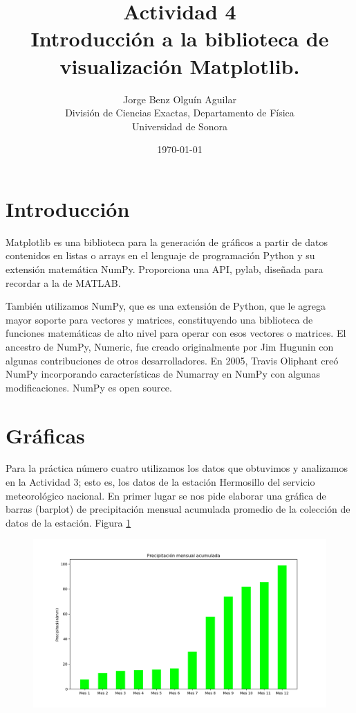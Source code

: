 \documentclass[12pt,a4paper]{article}
\begin{document}
\title{Actividad 4\\ Introducción a la biblioteca de visualización Matplotlib.  }
\author{
 Jorge Benz Olguín Aguilar\\
\small{División de Ciencias Exactas, Departamento de Física}\\
\small{Universidad de Sonora}\\
}
\date{\small{\today}}
\maketitle

\section*{Introducción}

\noindent Matplotlib es una biblioteca para la generación de gráficos a partir de datos contenidos en listas o arrays en el lenguaje de programación Python y su extensión matemática NumPy. Proporciona una API, pylab, diseñada para recordar a la de MATLAB.\cite{1}

\noindent También utilizamos NumPy, que es una extensión de Python, que le agrega mayor soporte para vectores y matrices, constituyendo una biblioteca de funciones matemáticas de alto nivel para operar con esos vectores o matrices. El ancestro de NumPy, Numeric, fue creado originalmente por Jim Hugunin con algunas contribuciones de otros desarrolladores. En 2005, Travis Oliphant creó NumPy incorporando características de Numarray en NumPy con algunas modificaciones. NumPy es open source. \cite{2}

\section*{Gráficas}


\noindent Para la práctica número cuatro utilizamos los datos que obtuvimos y analizamos en la Actividad 3; esto es, los datos de la estación Hermosillo del servicio meteorológico nacional. En primer lugar se nos pide elaborar una gráfica de barras (barplot) de precipitación mensual acumulada promedio de la colección de datos de la estación. Figura \ref{Fig:precipMenAcum}



\begin{figure}[H]
\centering
\includegraphics[scale=0.55]{PreciMesAcum.png}
\caption{}
\label{Fig:precipMenAcum}
\end{figure}
\end{document}
